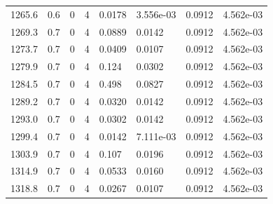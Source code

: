 \documentclass[preview]{standalone}
\begin{document}
{{{{{{\begin{tabular}{L{1.2cm}C{1.2cm} C{0.3cm}C{0.5cm} C{1.4cm}C{1.4cm} C{1.4cm}C{1.4cm}}
  1265.6  &   0.6  & 0     &  4 &  0.0178  & 3.556e-03  & 0.0912 &  4.562e-03   \\ 
  1269.3  &   0.7  & 0     &  4 &  0.0889  & 0.0142  & 0.0912 &  4.562e-03   \\ 
  1273.7  &   0.7  & 0     &  4 &  0.0409  & 0.0107  & 0.0912 &  4.562e-03   \\ 
  1279.9  &   0.7  & 0     &  4 &  0.124  & 0.0302  & 0.0912 &  4.562e-03   \\ 
  1284.5  &   0.7  & 0     &  4 &  0.498  & 0.0827  & 0.0912 &  4.562e-03   \\ 
  1289.2  &   0.7  & 0     &  4 &  0.0320  & 0.0142  & 0.0912 &  4.562e-03   \\ 
  1293.0  &   0.7  & 0     &  4 &  0.0302  & 0.0142  & 0.0912 &  4.562e-03   \\ 
  1299.4  &   0.7  & 0     &  4 &  0.0142  & 7.111e-03  & 0.0912 &  4.562e-03   \\ 
  1303.9  &   0.7  & 0     &  4 &  0.107  & 0.0196  & 0.0912 &  4.562e-03   \\ 
  1314.9  &   0.7  & 0     &  4 &  0.0533  & 0.0160  & 0.0912 &  4.562e-03   \\ 
  1318.8  &   0.7  & 0     &  4 &  0.0267  & 0.0107  & 0.0912 &  4.562e-03   \\ 
\hline 
\end{tabular} 

}}}}}}
\end{document}

